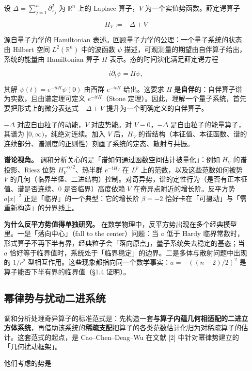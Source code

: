 \documentclass[a4paper,11pt,openany]{ctexbook}
\numberwithin{equation}{chapter}
\numberwithin{figure}{chapter}
\numberwithin{table}{chapter}
\begin{document}
设 $\Delta=\sum_{j=1}^n \partial_{x_j}^2$ 为 $\mathbb R^n$ 上的 Laplace 算子，$V$ 为一个实值势函数。薛定谔算子

$$H_V := -\Delta + V$$

源自量子力学的 Hamiltonian 表述。回顾量子力学的公理：一个量子系统的状态由 Hilbert 空间 $L^2(\mathbb R^n)$ 中的波函数 $\psi$ 描述，可观测量的期望由自伴算子给出，系统的能量由 Hamiltonian 算子 $H$ 表示。态的时间演化满足薛定谔方程

$$i\partial_t\psi = H\psi,$$

其解 $\psi(t)=e^{-itH}\psi(0)$ 由酉群 $e^{-itH}$ 给出。这要求 $H$ 是\textbf{自伴}的：自伴算子谱为实数，且由谱定理可定义 $e^{-itH}$（Stone 定理）。因此，理解一个量子系统，首先要把形式上的微分表达式 $- \Delta+V$ 提升为一个明确定义的自伴算子。

$-\Delta$ 对应自由粒子的动能，$V$ 对应势能。对 $V\equiv 0$，$-\Delta$ 是自由粒子的能量算子，其谱为 $[0,\infty)$，纯绝对连续。加入 $V$ 后，$H_V$ 的谱结构（本征值、本征函数、谱的连续部分、谱测度的正则性）刻画了系统的定态、散射与共振。

\textbf{谱论视角。} 调和分析关心的是「谱如何通过函数空间估计被量化」：例如 $H_V$ 的谱投影、Riesz 位势 $H_V^{-\alpha/2}$、热半群 $e^{-tH_V}$ 在 $L^p$ 上的范数，以及这些范数如何被势 $V$ 的几何（临界半径、二进结构）控制。对奇异势，谱的定性行为（是否有正本征值、谱是否连续、$0$ 是否临界）高度依赖 $V$ 在奇异点附近的增长阶。反平方势 $a|x|^{-2}$ 正是「临界」的一个典型：它的增长阶 $\beta=-2$ 恰好卡在「可摄动」与「需重新构造」的分界线上。

\textbf{为什么反平方势值得单独研究。} 在数学物理中，反平方势出现在多个经典模型里。一是「落向中心」（fall to the center）问题：当 $a$ 低于 Hardy 临界常数时，形式算子不再下半有界，经典粒子会「落向原点」，量子系统失去稳定的基态；当 $a$ 恰好等于临界值时，系统处于「临界稳定」的边界。二是多体与散射问题中出现的 $1/r^2$ 型相互作用。这些现象都指向同一个数学事实：$a=-((n-2)/2)^2$ 是算子能否下半有界的临界值（§1.4 证明）。

\subsection{幂律势与扰动二进系统}

调和分析处理奇异算子的标准范式是：先构造一套\textbf{与算子内蕴几何相适配的二进立方体系统}，再借助该系统的\textbf{稀疏支配}把算子的各类范数估计化归为对稀疏算子的估计。这套范式的起点，是 Cao–Chen–Deng–Wu 在文献 [2] 中针对幂律势建立的「几何扰动框架」。

他们考虑的势是
\end{document}
